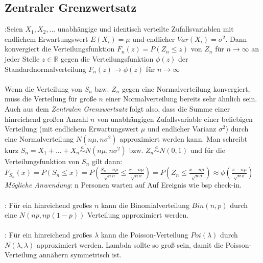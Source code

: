\subsection{Zentraler Grenzwertsatz}
:Seien $X_1, X_2, ...$ unabhängige und identisch verteilte Zufallsvariablen mit endlichem Erwartungswert $E(X_i) = \mu$ und endlicher $Var(X_i) = \sigma^2$. Dann konvergiert die Verteilungsfunktion $F_n(z) = P(Z_n \le z)$ von $Z_n$ für $n \rightarrow \infty$ an jeder Stelle $z \in \mathds{R}$ gegen die Verteilungsfunktion $\phi(z)$ der Standardnormalverteilung $F_n(z) \rightarrow \phi(z)$ für $n \rightarrow \infty$\\\\
Wenn die Verteilung von $S_n$ bzw. $Z_n$ gegen eine Normalverteilung konvergiert, muss die Verteilung für große $n$ einer Normalverteilung bereits sehr ähnlich sein. Auch aus dem \emph{Zentralen Grenzwertsatz} folgt also, dass die Summe einer hinreichend großen Anzahl $n$ von unabhängigen Zufallsvariable einer beliebigen Verteilung (mit endlichem Erwartungswert $\mu$ und endlicher Varianz $\sigma^2$) durch eine Normalverteilung $N(n\mu, n\sigma^2)$ approximiert werden kann. Man schreibt kurz $S_n = X_1 + ... + X_n \overset{a}{\sim} N(n\mu, n\sigma^2)$ bzw. $Z_n \overset{a}{\sim} N(0, 1)$ und für die Verteilungsfunktion von $S_n$ gilt dann: $F_{S_n}(x) = P(S_n \le x) = P(\frac{S_n - n\mu}{\sqrt{n}\sigma} \le \frac{x - n\mu}{\sqrt{n}\sigma}) = P(Z_n \le \frac{x - n\mu}{\sqrt{n}\sigma}) \approx \phi(\frac{x - n\mu}{\sqrt{n}\sigma})$
\emph{Mögliche Anwendung}: n Personen warten auf Auf Ereignis wie bsp check-in.\\\\
: Für ein hinreichend großes $n$ kann die Binomialverteilung $Bin(n, p)$ durch eine $N(np, np(1-p))$ Verteilung approximiert werden.\\\\
: Für ein hinreichend großes $\lambda$ kann die Poisson-Verteilung $Poi(\lambda)$ durch $N(\lambda, \lambda)$ approximiert werden. Lambda sollte so groß sein, damit die Poisson-Verteilung annähern symmetrisch ist.\\
